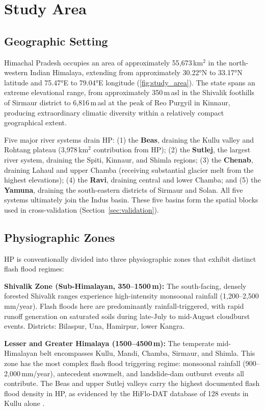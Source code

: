 \section{Study Area}
\label{sec:study_area}

\subsection{Geographic Setting}
\label{sec:geography}

Himachal Pradesh occupies an area of approximately 55,673\,km$^2$
in the north-western Indian Himalaya, extending from
approximately 30.22°N to 33.17°N latitude and 75.47°E to 79.04°E longitude
(\cref{fig:study_area}).
The state spans an extreme elevational range, from approximately 350\,m\,asl
in the Shivalik foothills of Sirmaur district to 6,816\,m\,asl
at the peak of Reo Purgyil in Kinnaur, producing extraordinary climatic diversity
within a relatively compact geographical extent.

Five major river systems drain HP:
(1) the \textbf{Beas}, draining the Kullu valley and Rohtang plateau (3,978\,km$^2$
contribution from HP);
(2) the \textbf{Sutlej}, the largest river system, draining the Spiti,
Kinnaur, and Shimla regions;
(3) the \textbf{Chenab}, draining Lahaul and upper Chamba (receiving substantial
glacier melt from the highest elevations);
(4) the \textbf{Ravi}, draining central and lower Chamba; and
(5) the \textbf{Yamuna}, draining the south-eastern districts of Sirmaur and Solan.
All five systems ultimately join the Indus basin.
These five basins form the spatial blocks used in cross-validation
(Section~\ref{sec:validation}).

\subsection{Physiographic Zones}
\label{sec:physiography}

HP is conventionally divided into three physiographic zones
that exhibit distinct flash flood regimes:

\textbf{Shivalik Zone (Sub-Himalayan, 350--1500\,m):}
The south-facing, densely forested Shivalik ranges experience
high-intensity monsoonal rainfall (1,200--2,500\,mm/year).
Flash floods here are predominantly rainfall-triggered,
with rapid runoff generation on saturated soils during
late-July to mid-August cloudburst events.
Districts: Bilaspur, Una, Hamirpur, lower Kangra.

\textbf{Lesser and Greater Himalaya (1500--4500\,m):}
The temperate mid-Himalayan belt encompasses Kullu, Mandi, Chamba, Sirmaur, and Shimla.
This zone has the most complex flash flood triggering regime:
monsoonal rainfall (900--2,000\,mm/year), antecedent snowmelt,
and landslide-dam outburst events all contribute.
The Beas and upper Sutlej valleys carry the highest documented flash flood density
in HP, as evidenced by the HiFlo-DAT database of 128 events in Kullu alone
\citep{hiflodot2025}.

